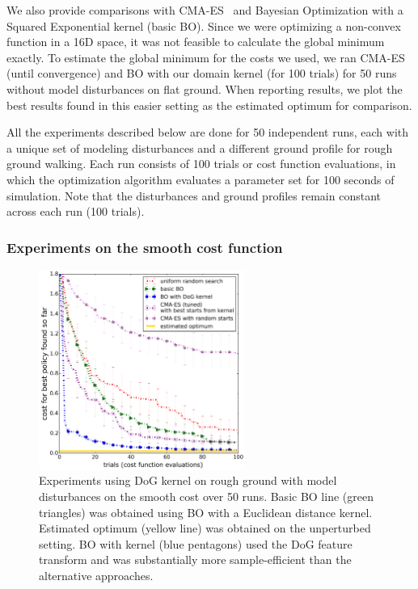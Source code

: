 We also provide comparisons with \mbox{CMA-ES}~\cite{hansen2006cma} and Bayesian Optimization with a Squared Exponential kernel (basic BO). Since we were optimizing a non-convex function in a 16D space, it was not feasible to calculate the global minimum exactly. To estimate the global minimum for the costs we used, we ran CMA-ES (until convergence) and BO with our domain kernel (for 100 trials) for 50 runs without model disturbances on flat ground. 
When reporting results, we plot the best results found in this easier setting as the estimated optimum for comparison.

All the experiments described below are done for 50 independent runs, each with a unique set of modeling disturbances and a different ground profile for rough ground walking. Each run  consists of 100 trials or cost function evaluations, in which the optimization algorithm evaluates a parameter set for 100 seconds of simulation. Note that the disturbances and ground profiles remain constant across each run (100 trials).

\subsubsection{Experiments on the smooth cost function}

\begin{figure}[t]
\centering
\includegraphics[width=0.6\textwidth]{img/rnd_bo_bo_covLoc_cma_rough6_disturb_smooth_cost.png}
\caption{Experiments using DoG kernel on rough ground with model disturbances on the smooth cost over 50 runs. Basic BO line (green triangles) was obtained using BO with a Euclidean distance kernel. Estimated optimum (yellow line) was obtained on the unperturbed setting. BO with \dogkernel kernel (blue pentagons) used the DoG feature transform and was substantially more sample-efficient than the alternative approaches.}
\label{fig_bo_locomotion}
\end{figure}

